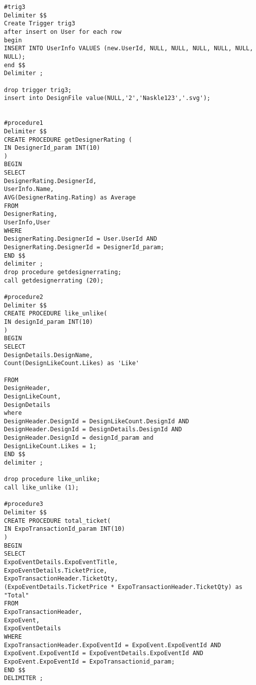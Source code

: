 \begin{lstlisting}
#trig3
Delimiter $$
Create Trigger trig3
after insert on User for each row 
begin
INSERT INTO UserInfo VALUES (new.UserId, NULL, NULL, NULL, NULL, NULL, NULL);
end $$
Delimiter ;

drop trigger trig3;
insert into DesignFile value(NULL,'2','Naskle123','.svg');


#procedure1
Delimiter $$
CREATE PROCEDURE getDesignerRating (
IN DesignerId_param INT(10)
)
BEGIN
SELECT 
DesignerRating.DesignerId, 
UserInfo.Name,
AVG(DesignerRating.Rating) as Average
FROM 
DesignerRating, 
UserInfo,User
WHERE
DesignerRating.DesignerId = User.UserId AND
DesignerRating.DesignerId = DesignerId_param;
END $$
delimiter ;
drop procedure getdesignerrating;
call getdesignerrating (20);

#procedure2
Delimiter $$
CREATE PROCEDURE like_unlike(
IN designId_param INT(10)
)
BEGIN
SELECT
DesignDetails.DesignName, 
Count(DesignLikeCount.Likes) as 'Like'

FROM
DesignHeader,
DesignLikeCount,
DesignDetails
where 
DesignHeader.DesignId = DesignLikeCount.DesignId AND 
DesignHeader.DesignId = DesignDetails.DesignId AND 
DesignHeader.DesignId = designId_param and
DesignLikeCount.Likes = 1;
END $$
delimiter ;

drop procedure like_unlike;
call like_unlike (1);

#procedure3
Delimiter $$
CREATE PROCEDURE total_ticket(
IN ExpoTransactionId_param INT(10)
)
BEGIN
SELECT
ExpoEventDetails.ExpoEventTitle,
ExpoEventDetails.TicketPrice,
ExpoTransactionHeader.TicketQty,
(ExpoEventDetails.TicketPrice * ExpoTransactionHeader.TicketQty) as "Total"
FROM 
ExpoTransactionHeader,
ExpoEvent,
ExpoEventDetails
WHERE
ExpoTransactionHeader.ExpoEventId = ExpoEvent.ExpoEventId AND
ExpoEvent.ExpoEventId = ExpoEventDetails.ExpoEventId AND
ExpoEvent.ExpoEventId = ExpoTransactionid_param;
END $$
DELIMITER ;
\end{lstlisting}